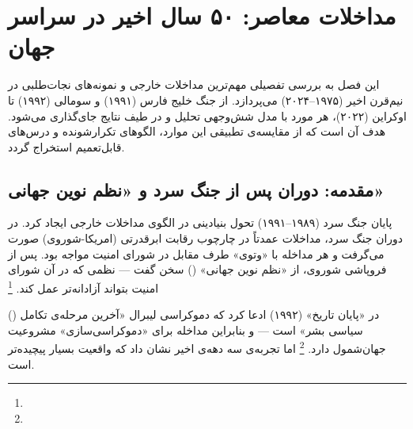 \chapter{مداخلات معاصر: ۵۰ سال اخیر در سراسر جهان}
\label{ch:contemporary}

\begin{tcolorbox}[mybox, title={چکیده‌ی فصل}]
این فصل به بررسی تفصیلی مهم‌ترین مداخلات خارجی و نمونه‌های نجات‌طلبی در نیم‌قرن اخیر (۱۹۷۵–۲۰۲۴) می‌پردازد. از جنگ خلیج فارس (۱۹۹۱) و سومالی (۱۹۹۲) تا اوکراین (۲۰۲۲)، هر مورد با مدل شش‌وجهی تحلیل و در طیف نتایج جای‌گذاری می‌شود. هدف آن است که از مقایسه‌ی تطبیقی این موارد، الگوهای تکرارشونده و درس‌های قابل‌تعمیم استخراج گردد.
\end{tcolorbox}

\section{مقدمه: دوران پس از جنگ سرد و «نظم نوین جهانی»}
\label{sec:ch10-intro}

پایان جنگ سرد (۱۹۸۹–۱۹۹۱) تحول بنیادینی در الگوی مداخلات خارجی ایجاد کرد. در دوران جنگ سرد، مداخلات عمدتاً در چارچوب رقابت ابرقدرتی (امریکا-شوروی) صورت می‌گرفت و هر مداخله با «وتوی» طرف مقابل در شورای امنیت مواجه بود. پس از فروپاشی شوروی،  از «نظم نوین جهانی» () سخن گفت — نظمی که در آن شورای امنیت بتواند آزادانه‌تر عمل کند.%
\footnote{}

 () در «پایان تاریخ» (۱۹۹۲) ادعا کرد که دموکراسی لیبرال «آخرین مرحله‌ی تکامل سیاسی بشر» است — و بنابراین مداخله برای «دموکراسی‌سازی» مشروعیت جهان‌شمول دارد.%
\footnote{}
اما تجربه‌ی سه دهه‌ی اخیر نشان داد که واقعیت بسیار پیچیده‌تر است.

